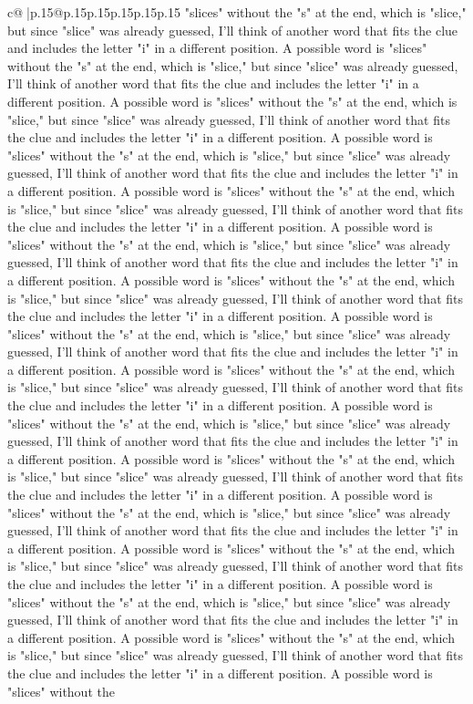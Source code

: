 \documentclass{article}
\begin{document}
{\begin{supertabular}{c@{$\;$}|p{.15\linewidth}@{}p{.15\linewidth}p{.15\linewidth}p{.15\linewidth}p{.15\linewidth}p{.15\linewidth}}
{{{"slices" without the "s" at the end, which is "slice," but since "slice" was already guessed, I'll think of another word that fits the clue and includes the letter "i" in a different position. A possible word is "slices" without the "s" at the end, which is "slice," but since "slice" was already guessed, I'll think of another word that fits the clue and includes the letter "i" in a different position. A possible word is "slices" without the "s" at the end, which is "slice," but since "slice" was already guessed, I'll think of another word that fits the clue and includes the letter "i" in a different position. A possible word is "slices" without the "s" at the end, which is "slice," but since "slice" was already guessed, I'll think of another word that fits the clue and includes the letter "i" in a different position. A possible word is "slices" without the "s" at the end, which is "slice," but since "slice" was already guessed, I'll think of another word that fits the clue and includes the letter "i" in a different position. A possible word is "slices" without the "s" at the end, which is "slice," but since "slice" was already guessed, I'll think of another word that fits the clue and includes the letter "i" in a different position. A possible word is "slices" without the "s" at the end, which is "slice," but since "slice" was already guessed, I'll think of another word that fits the clue and includes the letter "i" in a different position. A possible word is "slices" without the "s" at the end, which is "slice," but since "slice" was already guessed, I'll think of another word that fits the clue and includes the letter "i" in a different position. A possible word is "slices" without the "s" at the end, which is "slice," but since "slice" was already guessed, I'll think of another word that fits the clue and includes the letter "i" in a different position. A possible word is "slices" without the "s" at the end, which is "slice," but since "slice" was already guessed, I'll think of another word that fits the clue and includes the letter "i" in a different position. A possible word is "slices" without the "s" at the end, which is "slice," but since "slice" was already guessed, I'll think of another word that fits the clue and includes the letter "i" in a different position. A possible word is "slices" without the "s" at the end, which is "slice," but since "slice" was already guessed, I'll think of another word that fits the clue and includes the letter "i" in a different position. A possible word is "slices" without the "s" at the end, which is "slice," but since "slice" was already guessed, I'll think of another word that fits the clue and includes the letter "i" in a different position. A possible word is "slices" without the "s" at the end, which is "slice," but since "slice" was already guessed, I'll think of another word that fits the clue and includes the letter "i" in a different position. A possible word is "slices" without the "s" at the end, which is "slice," but since "slice" was already guessed, I'll think of another word that fits the clue and includes the letter "i" in a different position. A possible word is "slices" without the }}}
\end{supertabular}}
\end{document}
